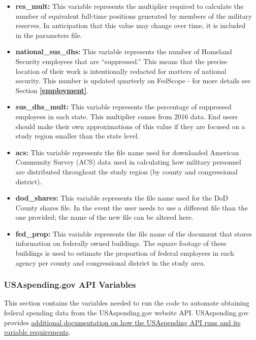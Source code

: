 \documentclass[
]{book}
\providecommand{\tightlist}{%
  \setlength{\itemsep}{0pt}\setlength{\parskip}{0pt}}
\begin{document}
\begin{itemize}
\tightlist
\item
  \textbf{res\_mult:} This variable represents the multiplier required to calculate the number of equivalent full-time positions generated by members of the military reserves. In anticipation that this value may change over time, it is included in the parameters file.\\
\item
  \textbf{national\_sus\_dhs:} This variable represents the number of Homeland Security employees that are ``suppressed.'' This means that the precise location of their work is intentionally redacted for matters of national security. This number is updated quarterly on FedScope - for more details see Section \textbf{\ref{employment}}.
\item
  \textbf{sus\_dhs\_mult:} This variable represents the percentage of suppressed employees in each state. This multiplier comes from 2016 data. End users should make their own approximations of this value if they are focused on a study region smaller than the state level.
\item
  \textbf{acs:} This variable represents the file name used for downloaded American Community Survey (ACS) data used in calculating how military personnel are distributed throughout the study region (by county and congressional district).\\
\item
  \textbf{dod\_shares:} This variable represents the file name used for the DoD County shares file. In the event the user needs to use a different file than the one provided; the name of the new file can be altered here.\\
\item
  \textbf{fed\_prop:} This variable represents the file name of the document that stores information on federally owned buildings. The square footage of these buildings is used to estimate the proportion of federal employees in each agency per county and congressional district in the study area.
\end{itemize}

\hypertarget{usa-api}{%
\subsubsection{USAspending.gov API Variables}\label{usa-api}}

This section contains the variables needed to run the code to automate obtaining federal spending data from the USAspending.gov website API. USAspending.gov provides \href{https://github.com/fedspendingtransparency/usaspending-api/blob/master/usaspending_api/api_contracts/contracts/v2/bulk_download/awards.md}{additional documentation on how the USAspending API runs and its variable requirements}.
\end{document}
